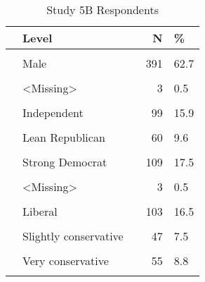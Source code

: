 \documentclass[border=1mm]{standalone}
\begin{document}
\begin{table}[!h]
\centering
\caption{Study 5B Respondents}
\centering
\begin{tabular}[t]{lllrl}
\toprule
  & Level &   & N & \%\\
\midrule
\cellcolor{gray!10}{Sex} & \cellcolor{gray!10}{Female} & \cellcolor{gray!10}{} & \cellcolor{gray!10}{227} & \cellcolor{gray!10}{36.4}\\
 & Male &  & 391 & 62.7\\
\cellcolor{gray!10}{} & \cellcolor{gray!10}{other} & \cellcolor{gray!10}{} & \cellcolor{gray!10}{3} & \cellcolor{gray!10}{0.5}\\
 & <Missing> &  & 3 & \vphantom{3} 0.5\\
\cellcolor{gray!10}{Party} & \cellcolor{gray!10}{Democrat} & \cellcolor{gray!10}{} & \cellcolor{gray!10}{111} & \cellcolor{gray!10}{17.8}\\
\addlinespace
 & Independent &  & 99 & 15.9\\
\cellcolor{gray!10}{} & \cellcolor{gray!10}{Lean Democrat} & \cellcolor{gray!10}{} & \cellcolor{gray!10}{80} & \cellcolor{gray!10}{12.8}\\
 & Lean Republican &  & 60 & 9.6\\
\cellcolor{gray!10}{} & \cellcolor{gray!10}{Republican} & \cellcolor{gray!10}{} & \cellcolor{gray!10}{84} & \cellcolor{gray!10}{13.5}\\
 & Strong Democrat &  & 109 & 17.5\\
\addlinespace
\cellcolor{gray!10}{} & \cellcolor{gray!10}{Strong Republican} & \cellcolor{gray!10}{} & \cellcolor{gray!10}{78} & \cellcolor{gray!10}{12.5}\\
 & <Missing> &  & 3 & \vphantom{2} 0.5\\
\cellcolor{gray!10}{Ideology} & \cellcolor{gray!10}{Conservative} & \cellcolor{gray!10}{} & \cellcolor{gray!10}{76} & \cellcolor{gray!10}{12.2}\\
 & Liberal &  & 103 & 16.5\\
\cellcolor{gray!10}{} & \cellcolor{gray!10}{Moderate} & \cellcolor{gray!10}{} & \cellcolor{gray!10}{86} & \cellcolor{gray!10}{13.8}\\
\addlinespace
 & Slightly conservative &  & 47 & 7.5\\
\cellcolor{gray!10}{} & \cellcolor{gray!10}{Slightly liberal} & \cellcolor{gray!10}{} & \cellcolor{gray!10}{61} & \cellcolor{gray!10}{9.8}\\
 & Very conservative &  & 55 & 8.8\\
\cellcolor{gray!10}{} & \cellcolor{gray!10}{Very liberal} & \cellcolor{gray!10}{} & \cellcolor{gray!10}{67} & \cellcolor{gray!10}{10.7}\\

\end{tabular}
\end{table}
\end{document}
